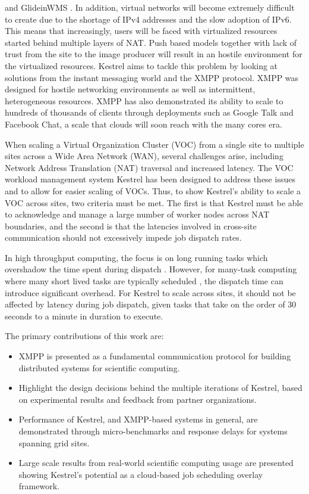 and GlideinWMS \cite{Sfiligoi2008}. In addition, virtual networks
will become extremely difficult to create due to the shortage of IPv4
addresses and the slow adoption of IPv6. This means that increasingly,
users will be faced with virtualized resources started behind multiple
layers of NAT. Push based models together with lack of trust from
the site to the image producer will result in an hostile environment
for the virtualized resources. Kestrel aims to tackle this problem
by looking at solutions from the instant messaging world and the XMPP
protocol. XMPP was designed for hostile networking environments as
well as intermittent, heterogeneous resources. XMPP has also demonstrated
its ability to scale to hundreds of thousands of clients through deployments
such as Google Talk and Facebook Chat, a scale that clouds will soon
reach with the many cores era.

When scaling a Virtual Organization Cluster (VOC) \cite{Murphy2009,Murphy2009a,Murphy2010}
from a single site to multiple sites across a Wide Area Network (WAN),
several challenges arise, including Network Address Translation (NAT)
traversal and increased latency. The VOC workload management system
Kestrel has been designed to address these issues and to allow for
easier scaling of VOCs. Thus, to show Kestrel's ability to scale a
VOC across sites, two criteria must be met. The first is that Kestrel
must be able to acknowledge and manage a large number of worker nodes
across NAT boundaries, and the second is that the latencies involved
in cross-site communication should not excessively impede job dispatch
rates.

In high throughput computing, the focus is on long running tasks which
overshadow the time spent during dispatch \cite{Tannenbaum2001,DouglasThain2006}.
However, for many-task computing where many short lived tasks are
typically scheduled \cite{Raicu2008}, the dispatch time can introduce
significant overhead. For Kestrel to scale across sites, it should
not be affected by latency during job dispatch, given tasks that take
on the order of 30 seconds to a minute in duration to execute.


The primary contributions of this work are:
\begin{itemize}
\item XMPP is presented as a fundamental communication protocol for
building distributed systems for scientific computing.
\item Highlight the design decisions behind the multiple iterations
of Kestrel, based on experimental results and feedback from partner
organizations.
\item Performance of Kestrel, and XMPP-based systems in general,
are demonstrated through micro-benchmarks and response delays for
systems spanning grid sites.
\item Large scale results from real-world scientific computing usage
are presented showing Kestrel's potential as a cloud-based job
scheduling overlay framework.
\end{itemize}

